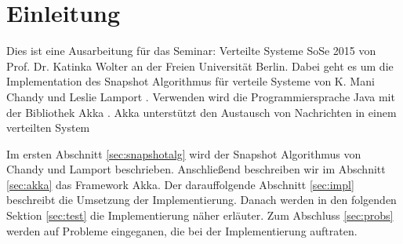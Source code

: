 \section{Einleitung}
\label{sec:einl}
Dies ist eine Ausarbeitung für das Seminar: Verteilte Systeme SoSe 2015 von
Prof. Dr. Katinka Wolter an der Freien Universität Berlin.  Dabei geht es um
die Implementation des Snapshot Algorithmus für verteile Systeme von K. Mani
Chandy und Leslie Lamport \cite{snapshotChandyLamport}. Verwenden wird die
Programmiersprache Java \cite{java} mit der Bibliothek Akka \cite{akka}.
Akka unterstützt den Austausch von Nachrichten in einem verteilten System

Im ersten Abschnitt \ref{sec:snapshotalg} wird der Snapshot Algorithmus von
Chandy und Lamport beschrieben. Anschließend beschreiben wir im Abschnitt
\ref{sec:akka} das Framework Akka. Der darauffolgende Abschnitt \ref{sec:impl}
beschreibt die Umsetzung der Implementierung. Danach
werden in den folgenden Sektion \ref{sec:test} die Implementierung näher
erläuter. Zum Abschluss \ref{sec:probs} werden auf Probleme eingeganen, die bei
der Implementierung auftraten.
